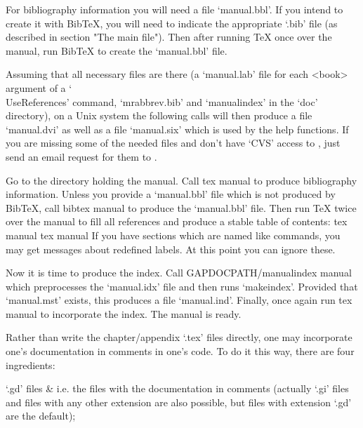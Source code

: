 For bibliography information you will need a file `manual.bbl'. If you
intend to create it with Bib{\TeX}, you will need to indicate the
appropriate `.bib' file (as described in section "The main file"). Then
after running {\TeX} once over the manual, run Bib{\TeX} to create the
`manual.bbl' file.

Assuming that all necessary files are there (a `manual.lab' file for each
<book> argument of a `\\UseReferences' command, `mrabbrev.bib' and
`manualindex' in the {\GAP} `doc' directory),
on a Unix system the following calls will then produce a file `manual.dvi'
as well as a file `manual.six' which is used by the {\GAP} help functions.
If you are missing some of the needed files and don't have `CVS' access to
{\GAP}, just send an email request for them to 
.

Go to the directory holding the manual. Call
\begintt
tex manual
\endtt
to produce bibliography information. Unless you provide a `manual.bbl' file
which is not produced by Bib{\TeX}, call
\begintt
bibtex manual
\endtt
to produce the `manual.bbl' file. Then run {\TeX} twice over the manual to
fill all references and produce a stable table of contents:
\begintt
tex manual
tex manual
\endtt
If you have sections which are named like commands, you may get messages
about redefined labels. At this point you can ignore these.

Now it is time to produce the index. Call
\begintt
GAPDOCPATH/manualindex manual
\endtt
which preprocesses the `manual.idx' file and then
runs `makeindex'. Provided that `manual.mst' exists, this produces a file
`manual.ind'. Finally, once again run
\begintt
tex manual
\endtt
to incorporate the index. The manual is ready.


\indextt{\\Declaration}\indextt{\\FileHeader}
Rather than write the chapter/appendix `.tex'  files  directly,  one  may
incorporate one's documentation in comments in one's {\GAP} code.  To  do
it this way, there are four ingredients:

\beginitems

`.gd' files &
i.e. the {\GAP} files with the documentation in comments (actually  `.gi'
files and files with any other extension are  also  possible,  but  files
with extension `.gd' are the default);

